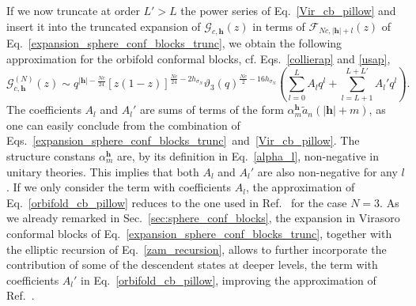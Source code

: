 \documentclass[a4paper,11pt]{article}
\begin{document}
If we now truncate at order $L'>L$ the power series of Eq.~\eqref{Vir_cb_pillow} and insert it into the truncated
expansion of $\mathcal{G}_{c, \boldsymbol{h}}(z)$ in terms of $\mathcal{F}_{Nc, |\boldsymbol{h}|+l}(z)$
of Eq.~\eqref{expansion_sphere_conf_blocks_trunc}, we obtain the following approximation for the orbifold 
conformal blocks, cf. Eqs.~\eqref{collierap} and \eqref{usap},
\begin{equation}\label{orbifold_cb_pillow}
 \mathcal{G}_{c, \boldsymbol{h}}^{(N)}(z)
 \sim q^{|\boldsymbol{h}|-\frac{Nc}{24}}\left[z(1-z)\right]^{\frac{Nc}{24}-2h_{\sigma_N}}
 \vartheta_3(q)^{\frac{Nc}{2}-16h_{\sigma_N}}
 \left(\sum_{l=0}^L A_l q^l+\sum_{l=L+1}^{L+L'} A_l' q^l\right).
\end{equation}
The coefficients $A_l$ and $A_l'$ are sums of terms of the form 
$\alpha_m^{\boldsymbol{h}} \tilde{a}_{n}(|\boldsymbol{h}|+m)$,
as one can easily conclude from the combination of Eqs.~\eqref{expansion_sphere_conf_blocks_trunc}~and~\eqref{Vir_cb_pillow}. 
The structure constans $\alpha_m^{\boldsymbol{h}}$ are, by its definition 
in Eq.~\eqref{alpha_l}, non-negative in unitary theories. This implies that 
both $A_l$ and $A_l'$ are also non-negative for any $l$. If we only consider 
the term with coefficients $A_l$, the approximation of Eq.~\eqref{orbifold_cb_pillow} 
reduces to the one used in Ref.~\cite{Collier} for the case $N=3$. As we already remarked 
in Sec.~\eqref{sec:sphere_conf_blocks}, the expansion in Virasoro conformal blocks of 
Eq.~\eqref{expansion_sphere_conf_blocks_trunc}, together with the elliptic recursion 
of Eq.~\eqref{zam_recursion}, allows to further incorporate the contribution of some 
of the descendent states at deeper levels, the term with coefficients $A_l'$ in 
Eq.~\eqref{orbifold_cb_pillow}, improving the approximation of Ref.~\cite{Collier}.
\end{document}

